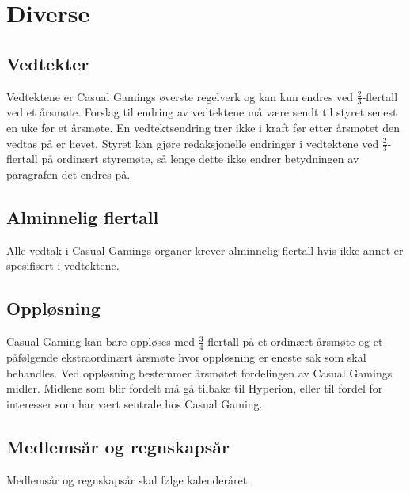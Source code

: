 \chapter{Diverse}

\section{Vedtekter}
Vedtektene er Casual Gamings øverste regelverk og kan kun endres ved $\frac{2}{3}$-flertall ved et årsmøte. Forslag til endring av vedtektene må være sendt til styret senest en uke før et årsmøte. En vedtektsendring trer ikke i kraft før etter årsmøtet den vedtas på er hevet. Styret kan gjøre redaksjonelle endringer i vedtektene ved $\frac{2}{3}$-flertall på ordinært styremøte, så lenge dette ikke endrer betydningen av paragrafen det endres på.

\section{Alminnelig flertall}
Alle vedtak i Casual Gamings organer krever alminnelig flertall hvis ikke annet er spesifisert i vedtektene.

\section{Oppløsning}
Casual Gaming kan bare oppløses med $\frac{3}{4}$-flertall på et ordinært årsmøte og et påfølgende ekstraordinært årsmøte hvor oppløsning er eneste sak som skal behandles. Ved oppløsning bestemmer årsmøtet fordelingen av Casual Gamings midler. Midlene som blir fordelt må gå tilbake til Hyperion, eller til fordel for interesser som har vært sentrale hos Casual Gaming.

\section{Medlemsår og regnskapsår}
Medlemsår og regnskapsår skal følge kalenderåret.
